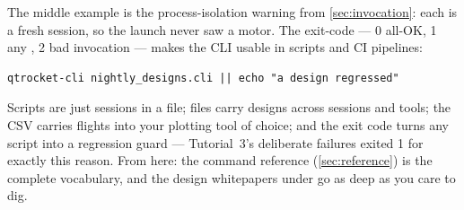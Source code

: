 The middle example is the process-isolation warning from
\cref{sec:invocation}: each  is a fresh session, so the
launch never saw a motor. The exit-code --- 0 all-OK, 1 any
, 2 bad invocation --- makes the CLI usable in
scripts and CI pipelines:

\begin{verbatim}
qtrocket-cli nightly_designs.cli || echo "a design regressed"
\end{verbatim}

\begin{tip}
Scripts are just sessions in a file;  files carry designs across
sessions and tools; the CSV carries flights into your plotting tool of
choice; and the exit code turns any script into a regression guard ---
Tutorial~3's deliberate failures exited 1 for exactly this reason. From here:
the command reference (\cref{sec:reference}) is the complete vocabulary, and
the design whitepapers under  go as deep as you care to dig.
\end{tip}
